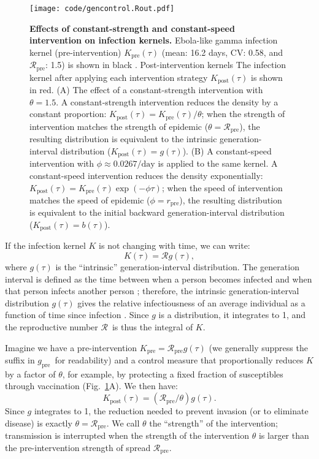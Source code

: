 \documentclass[12pt]{article}
\newcommand{\RR}{\ensuremath{{\mathcal R}}}
\newcommand{\Rx}[1]{\ensuremath{\RR_{\mathrm{#1}}}}
\newcommand{\Rpre}{\Rx{pre}}
\newcommand{\KK}{\ensuremath{{K}}}
\newcommand{\Kx}[1]{\ensuremath{\KK_{\mathrm{#1}}}}
\newcommand{\Kpre}{\Kx{pre}}
\newcommand{\Kpost}{\Kx{post}}
\newcommand{\ggg}{\ensuremath{{g}}}
\newcommand{\gx}[1]{\ensuremath{\ggg_{\mathrm{#1}}}}
\newcommand{\gpre}{\gx{pre}}
\newcommand{\rr}{\ensuremath{{r}}}
\newcommand{\rx}[1]{\ensuremath{\rr_{\mathrm{#1}}}}
\newcommand{\rpre}{\rx{pre}}
\newcommand{\figref}[1]{Fig.~\ref{fig:#1}}
\newcommand{\figlab}[1]{\label{fig:#1}}
\newcommand{\eqlab}[1]{\label{eq:#1}}
\begin{document}
\begin{figure}[!t]
\texttt{[image: code/gencontrol.Rout.pdf]}
\caption{
\textbf{Effects of constant-strength and constant-speed intervention on infection kernels.}
Ebola-like gamma infection kernel (pre-intervention) $\Kpre(\tau)$ (mean: 16.2 days, CV: 0.58, and \Rpre: 1.5) is shown in black \citep{park2019practical}.
Post-intervention kernels The infection kernel after applying each intervention strategy $\Kpost(\tau)$ is shown in red.
(A) The effect of a constant-strength intervention with $\theta = 1.5$.
A constant-strength intervention reduces the density by a constant proportion: $\Kpost(\tau) = \Kpre(\tau)/\theta$; when the strength of intervention matches the strength of epidemic ($\theta = \Rpre$), the resulting distribution is equivalent to the intrinsic generation-interval distribution ($\Kpost(\tau) = g(\tau)$).
(B) A constant-speed intervention with $\phi \approx 0.0267/\mathrm{day}$ is applied to the same kernel.
A constant-speed intervention reduces the density exponentially: $\Kpost(\tau) = \Kpre(\tau) \exp(-\phi \tau)$; when the speed of intervention matches the speed of epidemic ($\phi = \rpre$), the resulting distribution is equivalent to the initial backward generation-interval distribution ($\Kpost(\tau) = b(\tau)$). 
}
\figlab{constant}
\end{figure}

If the infection kernel $K$ is not changing with time, we can write:
\begin{equation}
	K(\tau) = \RR g(\tau),
	\eqlab{strengthFactors}
\end{equation}
where $g(\tau)$ is the ``intrinsic'' generation-interval distribution.
The generation interval is defined as the time between when a person becomes infected and when that person infects another person \citep{svensson2007note};
therefore, the intrinsic generation-interval distribution $g(\tau)$ gives the relative infectiousness of an average individual as a function of time since infection \citep{champredon2015intrinsic}. 
Since $g$ is a distribution, it integrates to 1, and the reproductive number \RR\ is thus the integral of $K$.

Imagine we have a pre-intervention $\Kpre = \Rpre g(\tau)$ (we generally suppress the suffix in \gpre\ for readability) and a control measure that proportionally reduces $K$ by a factor of $\theta$, for example, by protecting a fixed fraction of susceptibles through vaccination (\figref{constant}A). We then have:
\begin{equation}
	\Kpost(\tau) = (\Rpre/\theta) g(\tau).
\end{equation}
Since $g$ integrates to 1, the reduction needed to prevent invasion (or to eliminate disease) is exactly $\theta=\Rpre$. We call $\theta$ the ``strength'' of the intervention; transmission is interrupted when the strength of the intervention $\theta$ is larger than the pre-intervention strength of spread $\Rpre$.
\end{document}
